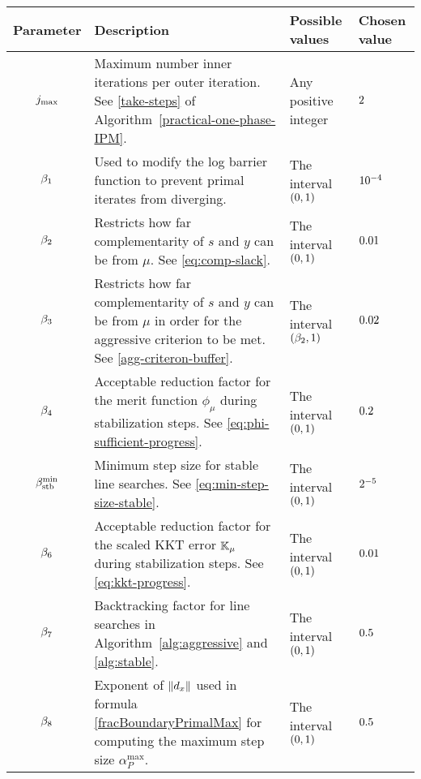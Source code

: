 \documentclass{article}
\begin{document}
\begin{table}[H]
\begin{tabular}{ |c| p{7cm}|p{4.0cm}| p{3cm}| } 
 \hline
Parameter & Description & Possible values & Chosen value  \\ 
 \hline
$j_{\max}$ & Maximum number inner iterations per outer iteration. See \eqref{take-steps} of Algorithm~\ref{practical-one-phase-IPM}.  & Any positive integer & $2$  \\ 
\hline
$\beta_{1}$ & Used to modify the log barrier function to prevent primal iterates from diverging. & The interval $(0,1)$ & $10^{-4}$ \\
\hline
  $\beta_{2}$ & Restricts how far complementarity of $s$ and $y$ can be from $\mu$. See \eqref{eq:comp-slack}.  & The interval $(0,1)$ & $0.01$ \\ 
 \hline
   $\beta_{3}$ & Restricts how far complementarity of $s$ and $y$ can be from $\mu$ in order for the aggressive criterion to be met. See \eqref{agg-criteron-buffer}.  & The interval  $(\beta_{2},1)$ & $0.02$  \\ 
    \hline
            $\beta_{4}$ & Acceptable reduction factor for the merit function $\phi_{\mu}$ during stabilization steps. See \eqref{eq:phi-sufficient-progress}.  & The interval $(0,1)$ & $0.2$  \\
    \hline
   $\beta_{\text{stb}}^{\min}$ & Minimum step size for stable line searches. See \eqref{eq:min-step-size-stable}.  & The interval $(0,1)$ & $2^{-5}$  \\ 
   \hline 
      $\beta_{6}$ & Acceptable reduction factor for the scaled KKT error $\mathbb{K}_{\mu}$ during stabilization steps. See \eqref{eq:kkt-progress}.  & The interval $(0,1)$ & $0.01$ \\ 
      \hline
    $\beta_{7}$ & Backtracking factor for line searches in Algorithm~\ref{alg:aggressive} and \ref{alg:stable}. & The interval $(0,1)$ & $0.5$ \\
    \hline
$\beta_{8}$ & Exponent of $\| d_{x} \|$ used in \fracBound{} formula \eqref{fracBoundaryPrimalMax} for computing the maximum step size $\alpha_{P}^{\max}$. & The interval $(0,1)$ & $0.5$ \\

\end{tabular}
\end{table}
\end{document}
